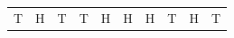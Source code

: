 {\begin{center}
\begin{xtabular*}{\mytablewidth}[t]{|p{10\mystarwidth}|p{10\mystarwidth}|p{10\mystarwidth}|p{10\mystarwidth}|p{10\mystarwidth}|p{10\mystarwidth}|p{10\mystarwidth}|p{10\mystarwidth}|p{10\mystarwidth}|p{10\mystarwidth}|}
    
        T &
    
    
        H &
    
    
        T &
    
    
        T &
    
    
        H &
    
    
        H &
    
    
        H &
    
    
        T &
    
    
        H &
    
    
        T%
     \tabularnewline{}
    

\end{xtabular*}
\end{center}}
